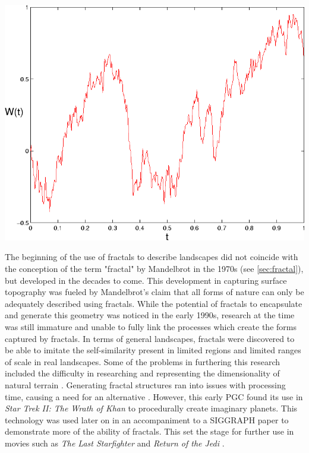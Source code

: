 \documentclass[10pt]{report}
\begin{document}
		\begin{minipage}{\textwidth}
			\centering
			\includegraphics[scale=.3]{wiener-process}
			\label{fig:wiener-proc}
		\end{minipage} 
		
		The beginning of the use of fractals to describe landscapes did not coincide with the conception of the term "fractal" by Mandelbrot in the 1970s (see \autoref{sec:fractal}), but developed in the decades to come. This development in capturing surface topography was fueled by Mandelbrot's claim that all forms of nature can only be adequately described using fractals. While the potential of fractals to encapsulate and generate this geometry was noticed in the early 1990s, research at the time was still immature and unable to fully link the processes which create the forms captured by fractals. In terms of general landscapes, fractals were discovered to be able to imitate the self-similarity present in limited regions and limited ranges of scale in real landscapes. Some of the problems in furthering this research included the difficulty in researching and representing the dimensionality of natural terrain \cite{XU1993245}. Generating fractal structures ran into issues with processing time, causing a need for an alternative \cite{inbook}. However, this early PGC found its use in \emph{Star Trek II: The Wrath of Khan} \cite{startrek} to procedurally create imaginary planets. This technology was used later on in an accompaniment to a SIGGRAPH paper to demonstrate more of the ability of fractals. This set the stage for further use in movies such as \emph{The Last Starfighter} and \emph{Return of the Jedi} \cite{ibm-fractal}. 
		
\end{document}

